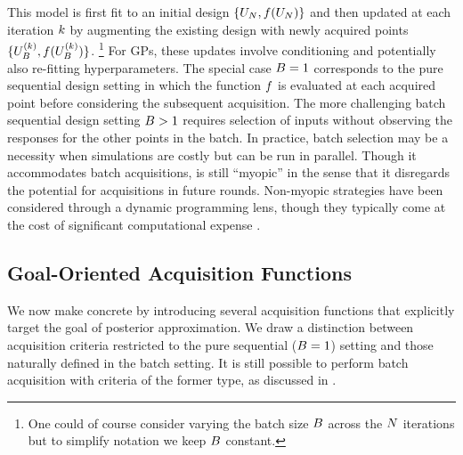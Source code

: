 \documentclass[12pt]{article}
\begin{document}
This model is first fit to an initial design $\{\designIn[\Ndesign], \func(\designIn[\Ndesign])\}$ and then 
updated at each iteration $\designIndex$ by augmenting the existing design with newly 
acquired points $\{\designBatchIn^{(\designIndex)}, \func(\designBatchIn^{(\designIndex)})\}$.
\footnote{One could of course consider varying the batch size $\Nbatch$ across the $\Ndesign$ iterations but to simplify notation
we keep $\Nbatch$ constant.}
For GPs, these updates involve conditioning and potentially also re-fitting hyperparameters. 
The special case $\Nbatch = 1$ corresponds to the 
pure sequential design setting in which the function $\func$ is evaluated at each acquired point before
considering the subsequent acquisition. The more challenging batch sequential design setting
$\Nbatch > 1$ requires selection of inputs without observing the responses for the other points
in the batch. In practice, batch selection may be a necessity when simulations are costly but can 
be run in parallel. Though it accommodates batch acquisitions,  is
still ``myopic'' in the sense that it disregards the potential for acquisitions in future rounds. 
Non-myopic strategies have been considered
through a dynamic programming lens, though they typically come at the cost of significant 
computational expense \citep{SURThesis, supermartingaleSUR}.

\subsection{Goal-Oriented Acquisition Functions}
We now make  concrete by introducing several acquisition functions
that explicitly target the goal of posterior approximation. We draw a distinction between 
acquisition criteria restricted to the pure sequential ($\Nbatch = 1$) setting
and those naturally defined in the batch setting. It is still possible to perform 
batch acquisition with criteria of the former type, as discussed in .
\end{document}
